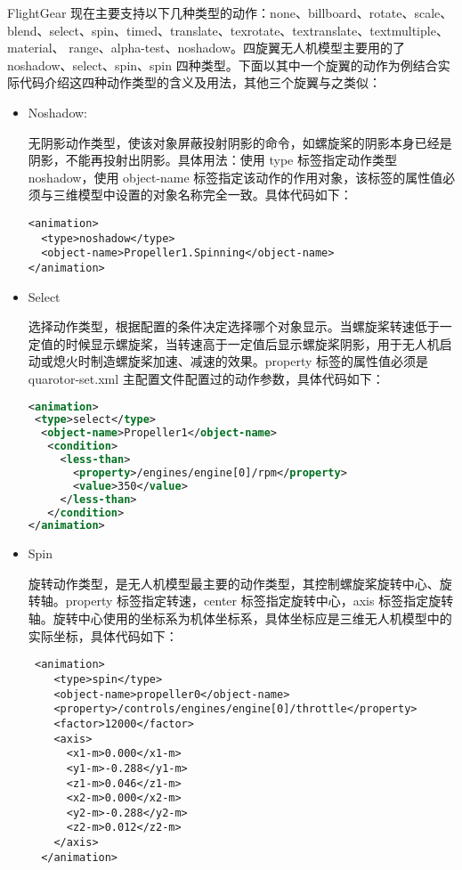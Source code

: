 FlightGear 现在主要支持以下几种类型的动作：none、billboard、rotate、scale、blend、select、spin、timed、translate、texrotate、textranslate、textmultiple、material、
range、alpha-test、noshadow。四旋翼无人机模型主要用的了 noshadow、select、spin、spin 四种类型。下面以其中一个旋翼的动作为例结合实际代码介绍这四种动作类型的含义及用法，其他三个旋翼与之类似：
\begin{itemize}
  \item Noshadow:

无阴影动作类型，使该对象屏蔽投射阴影的命令，如螺旋桨的阴影本身已经是阴影，不能再投射出阴影。具体用法：使用 type 标签指定动作类型 noshadow，使用 object-name 标签指定该动作的作用对象，该标签的属性值必须与三维模型中设置的对象名称完全一致。具体代码如下：
\begin{lstlisting}[language={[ANSI]C++}]
<animation>
  <type>noshadow</type>
  <object-name>Propeller1.Spinning</object-name>
</animation>
\end{lstlisting}
  \item Select

选择动作类型，根据配置的条件决定选择哪个对象显示。当螺旋桨转速低于一定值的时候显示螺旋桨，当转速高于一定值后显示螺旋桨阴影，用于无人机启动或熄火时制造螺旋桨加速、减速的效果。property 标签的属性值必须是 quarotor-set.xml 主配置文件配置过的动作参数，具体代码如下：
\begin{lstlisting}[language=XML]
<animation>
 <type>select</type>
  <object-name>Propeller1</object-name>
   <condition>
     <less-than>
       <property>/engines/engine[0]/rpm</property>
       <value>350</value>
     </less-than>
   </condition>
</animation>
\end{lstlisting}
  \item Spin

旋转动作类型，是无人机模型最主要的动作类型，其控制螺旋桨旋转中心、旋转轴。property 标签指定转速，center 标签指定旋转中心，axis 标签指定旋转轴。旋转中心使用的坐标系为机体坐标系，具体坐标应是三维无人机模型中的实际坐标，具体代码如下：
 \begin{lstlisting}
 <animation>
    <type>spin</type>
    <object-name>propeller0</object-name>
    <property>/controls/engines/engine[0]/throttle</property>
    <factor>12000</factor>
    <axis>
      <x1-m>0.000</x1-m>
      <y1-m>-0.288</y1-m>
      <z1-m>0.046</z1-m>
      <x2-m>0.000</x2-m>
      <y2-m>-0.288</y2-m>
      <z2-m>0.012</z2-m>
    </axis>
  </animation>
 \end{lstlisting}
\end{itemize}


